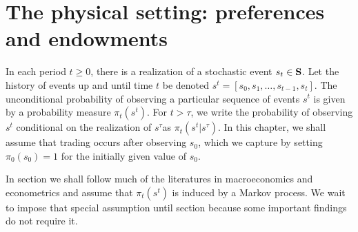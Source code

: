 \section{The physical setting: preferences and endowments}
In each period $t\geq 0$, there is a realization of a stochastic
event $s_t \in {\bf S}$. Let the history of events up and until time $t$
be denoted $s^t = [s_0, s_{1}, \ldots, s_{t-1}, s_t]$. The unconditional
probability of observing a particular sequence of events $s^t$ is
given by a probability measure $\pi_t(s^t)$. For $t > \tau$, we write the probability
of observing $s^t$ conditional on the realization of $s^\tau$as $\pi_t(s^t\vert s^\tau)$.
In this chapter, we shall assume that trading occurs after
observing $s_0$,
which we capture by setting $\pi_0(s_0)=1$ for the initially
given value of $s_0$.

 In section  we shall follow much of the
 literatures in macroeconomics and econometrics and assume that
 $\pi_t(s^t)$ is induced by  a Markov process. We wait to impose
 that special assumption until section  because some important findings do not
 require it.




